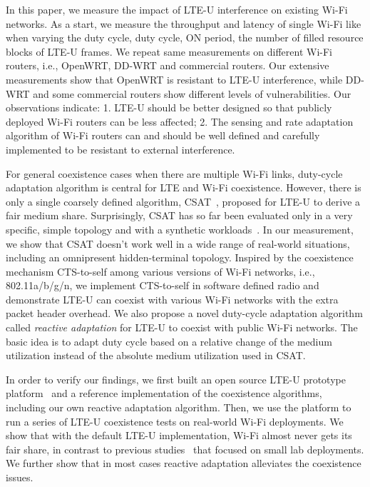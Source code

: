 In this paper, we measure the impact of LTE-U interference on existing Wi-Fi networks.
As a start, we measure the throughput and latency of single Wi-Fi like when varying
the duty cycle, duty cycle, ON period, the number of filled resource blocks 
of LTE-U frames. 
We repeat same measurements on different Wi-Fi routers, 
i.e., OpenWRT, DD-WRT and commercial routers. 
Our extensive measurements show that OpenWRT is resistant to LTE-U
interference, while DD-WRT and some commercial routers
show different levels of vulnerabilities. 
Our observations indicate: 1. LTE-U should be better designed
so that publicly deployed Wi-Fi routers can be less affected; 
2. The sensing and rate adaptation algorithm of Wi-Fi routers
can and should be well defined and carefully implemented to 
be resistant to external interference. 


For general coexistence cases when there are multiple Wi-Fi links, 
duty-cycle adaptation algorithm is central for LTE and Wi-Fi coexistence.
However, there is only a single coarsely defined algorithm, 
CSAT~\cite{lteuforum_csat}, proposed for LTE-U to derive a fair medium share.
Surprisingly, CSAT has so far been evaluated only in a very specific, 
simple topology and with a synthetic workloads~\cite{qualcommpresentation}. 
In our measurement, we show that CSAT doesn't work well in a wide range of real-world situations, including an omnipresent hidden-terminal topology. 
Inspired by the coexistence mechanism CTS-to-self 
among various versions of Wi-Fi networks, 
i.e., 802.11a/b/g/n, 
we implement CTS-to-self in software defined radio
and demonstrate LTE-U can coexist with various
Wi-Fi networks with the extra packet header overhead. 
We also propose a novel duty-cycle 
adaptation algorithm called {\em reactive adaptation}
for LTE-U to coexist with public Wi-Fi networks.
The basic idea is to adapt duty cycle based on a relative change of 
the medium utilization instead of the absolute medium utilization
used in CSAT. 


In order to verify our findings, we first built an open source LTE-U prototype platform~\cite{OpenLTEU} and a reference implementation of the coexistence algorithms, including our own reactive adaptation algorithm. 
Then, we use the platform to run a series of LTE-U coexistence tests on real-world Wi-Fi deployments. 
We show that with the default LTE-U implementation, Wi-Fi almost never gets its fair share, in contrast to previous studies~\cite{qualcommpresentation} that focused on small lab deployments. 
We further show that in most cases reactive adaptation alleviates the coexistence issues. 

